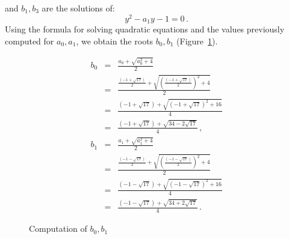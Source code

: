 \documentclass[11pt,a4paper]{article}
\newenvironment{form}[1]{%
\begin{displaymath}%
\renewcommand{\arraystretch}{#1}%
\begin{array}{lcl}}%
{\end{array}%
\end{displaymath}%
}
\newcommand*{\disfrac}[2]{\displaystyle\frac{#1}{#2}}
\begin{document}
and $b_1,b_3$ are the solutions of:
\[
y^2-a_1y-1 =0\,.
\]
Using the formula for solving quadratic equations and the values previously computed for $a_0,a_1$, we obtain the roots $b_0,b_1$ (Figure~\ref{fig.b01}).
\begin{figure}
\begin{form}{2.7}
b_0&=&\disfrac{a_0+\sqrt{a_0^2+4}}{2}\\
&=&\disfrac{
     \disfrac{(-1+\sqrt{17})}{2} + 
     \sqrt{\left(\disfrac{(-1+\sqrt{17})}{2}\right)^2+4}
   }{2}\\
&=&\disfrac{
     (-1+\sqrt{17}) + 
     \sqrt{\left(-1+\sqrt{17}\right)^2+16}
   }{4}\\
&=&\disfrac{
     (-1+\sqrt{17}) + 
     \sqrt{34-2\sqrt{17}}
   }{4}\,,\\
b_1&=&\disfrac{a_1+\sqrt{a_1^2+4}}{2}\\
&=&\disfrac{
     \disfrac{(-1-\sqrt{17})}{2} + 
     \sqrt{\left(\disfrac{(-1-\sqrt{17})}{2}\right)^2+4}
   }{2}\\
&=&\disfrac{
     (-1-\sqrt{17}) + 
     \sqrt{\left(-1-\sqrt{17}\right)^2+16}
   }{4}\\
&=&\disfrac{
     (-1-\sqrt{17}) + 
     \sqrt{34+2\sqrt{17}}
   }{4}\,.
\end{form}\vspace{-2em}
\caption{Computation of $b_0,b_1$}\label{fig.b01}
\end{figure}
\end{document}
